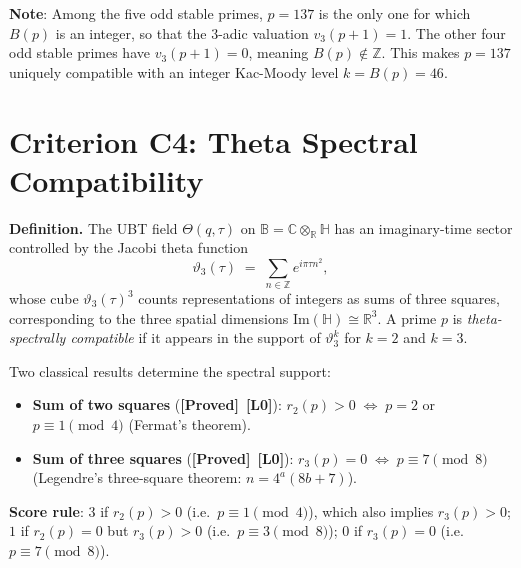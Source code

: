 \documentclass[12pt,a4paper]{article}
\theoremstyle{definition}
\theoremstyle{remark}
\newcommand{\BB}{\mathbb{B}}
\newcommand{\CC}{\mathbb{C}}
\newcommand{\RR}{\mathbb{R}}
\newcommand{\HH}{\mathbb{H}}
\newcommand{\ZZ}{\mathbb{Z}}
\newcommand{\PROVED}{\textbf{[Proved]}}
\newcommand{\Lzero}{\textbf{[L0]}}
\begin{document}
\begin{infobox}
\textbf{Note}: Among the five odd stable primes, $p = 137$ is the only
one for which $B(p)$ is an integer, so that the $3$-adic valuation
$v_3(p+1) = 1$.  The other four odd stable primes have $v_3(p+1) = 0$,
meaning $B(p) \notin \ZZ$.  This makes $p = 137$ uniquely compatible with
an integer Kac-Moody level $k = B(p) = 46$.
\end{infobox}

\section{Criterion C4: Theta Spectral Compatibility}
\label{sec:spr:c4}

\textbf{Definition.}
The UBT field $\Theta(q, \tau)$ on $\BB = \CC \otimes_\RR \HH$ has
an imaginary-time sector controlled by the Jacobi theta function
\[
  \vartheta_3(\tau) \;=\; \sum_{n \in \ZZ} e^{i\pi\tau n^2},
\]
whose cube $\vartheta_3(\tau)^3$ counts representations of integers as
sums of three squares, corresponding to the three spatial dimensions
$\mathrm{Im}(\HH) \cong \RR^3$.
A prime $p$ is \emph{theta-spectrally compatible} if it appears in the
support of $\vartheta_3^k$ for $k = 2$ and $k = 3$.

Two classical results determine the spectral support:
\begin{itemize}
  \item \textbf{Sum of two squares} (\PROVED\ \Lzero):
        $r_2(p) > 0 \;\Leftrightarrow\; p = 2$ or $p \equiv 1 \pmod{4}$
        (Fermat's theorem).
  \item \textbf{Sum of three squares} (\PROVED\ \Lzero):
        $r_3(p) = 0 \;\Leftrightarrow\; p \equiv 7 \pmod{8}$
        (Legendre's three-square theorem: $n = 4^a(8b+7)$).
\end{itemize}

\textbf{Score rule}:
$3$ if $r_2(p) > 0$ (i.e.\ $p \equiv 1 \pmod{4}$), which also implies $r_3(p) > 0$;
$1$ if $r_2(p) = 0$ but $r_3(p) > 0$ (i.e.\ $p \equiv 3 \pmod{8}$);
$0$ if $r_3(p) = 0$ (i.e.\ $p \equiv 7 \pmod{8}$).
\end{document}
